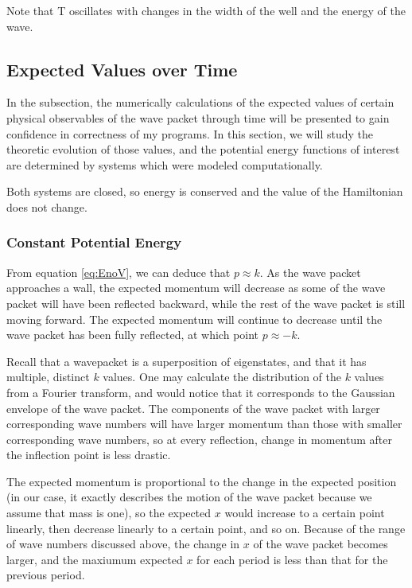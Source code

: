 \begin{center}
\end{center}

Note that T oscillates with changes in the width of the well and the energy
of the wave.

\subsection*{Expected Values over Time}
\label{sec:expected}

In the  subsection, the numerically calculations of
the expected values of certain physical observables of the wave packet
through time will be presented to gain confidence in correctness of my
programs. In this section, we will study the theoretic evolution of those
values, and the potential energy functions of interest are determined by
systems which were modeled computationally.

Both systems are closed, so energy is conserved and the value of the
Hamiltonian does not change.

\subsubsection*{Constant Potential Energy}

From equation \eqref{eq:EnoV}, we can deduce that $p \approx k$. As the wave
packet approaches a wall, the expected momentum will decrease as some of the
wave packet will have been reflected backward, while the rest of the wave
packet is still moving forward. The expected momentum will continue to
decrease until the wave packet has been fully reflected, at which point $p
\approx -k$.

Recall that a wavepacket is a superposition of eigenstates, and that it has
multiple, distinct $k$ values. One may calculate the distribution of the $k$
values from a Fourier transform, and would notice that it corresponds to the
Gaussian envelope of the wave packet. The components of the wave packet with
larger corresponding wave numbers will have larger momentum than those with
smaller corresponding wave numbers, so at every reflection, change in
momentum after the inflection point is less drastic.

The expected momentum is proportional to the change in the expected position
(in our case, it exactly describes the motion of the wave packet because we
assume that mass is one), so the expected $x$ would increase to a certain
point linearly, then decrease linearly to a certain point, and so on.
Because of the range of wave numbers discussed above, the change in $x$ of
the wave packet becomes larger, and the maxiumum expected $x$ for each
period is less than that for the previous period.

